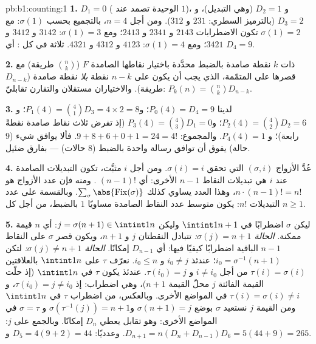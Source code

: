 \begin{solution}{pb:b1:counting:1}
\textbf{1.} $D_1 = 0$ ( الوحيدة تصمد عند $1$)، و $D_2 = 1$
(وهي التبديل)، و $D_3 = 2$ (بالترميز السطري: $231$ و $312$). ومن أجل
$n = 4$، بالتجميع بحسب $\sigma(1)$: مع $\sigma(1) = 2$ تكون الاضطرابات
$2143$ و $2341$ و $2413$؛ ومع $\sigma(1) = 3$: $3142$ و $3412$
و $3421$؛ ومع $\sigma(1) = 4$: $4123$ و $4312$ و $4321$. ثلاثة في كل
: أي $D_4 = 9$.

\textbf{2.}  ذات $k$ نقطة صامدة بالضبط محدَّدة
باختيار  نقاطها الصامدة $F$ ($\binom nk$ طريقة) مع
قصرها على المتمّمة، الذي يجب أن يكون  على $n - k$ نقطة
\emph{بلا} نقطة صامدة ($D_{n-k}$ طريقة). والاختياران مستقلان
والتقارن تقابليّ: $P_k(n) = \binom nk D_{n-k}$.

\textbf{3.} لدينا $P_0(4) = D_4 = 9$؛ و$P_1(4) = \binom41 D_3 = 4 \times 2
= 8$؛ و$P_2(4) = \binom42 D_2 = 6$؛ و$P_3(4) = \binom43 D_1 = 0$
(إذ تفرض ثلاث نقاط صامدة نقطةً رابعة)؛ و $P_4(4) = 1$. والمجموع: $9 + 8 + 6
+ 0 + 1 = 24 = 4!$. فألا يوافق شيء ($9$ حالة) يفوق أن توافق رسالة واحدة بالضبط
($8$ حالات) --- بفارق ضئيل.

\textbf{4.} عُدَّ الأزواج $(\sigma, i)$ التي تحقق $\sigma(i) = i$. ومن أجل
$i$ مثبَّت، تكون التبديلات الصامدة عند $i$ هي تبديلات النقاط
$n - 1$ الأخرى: أي $(n-1)!$ . ومنه فإن عدد الأزواج
هو $n \cdot (n-1)! = n!$، وهذا العدد يساوي كذلك
$\sum_\sigma \abs{\mathrm{Fix}(\sigma)}$. وبالقسمة على عدد
التبديلات $n!$: يكون متوسط عدد النقاط الصامدة مساويًا
$1$ بالضبط، من أجل كل $n \geq 1$.

\textbf{5.} ليكن $\sigma$ اضطرابًا في $\intint1{n+1}$ وليكن
$j = \sigma(n+1) \in \intint1n$: أي $n$ قيمة ممكنة. \emph{الحالة
$\sigma(j) = n+1$:} تتبادل النقطتان $j$ و $n+1$، ويكون قصر $\sigma$
على النقاط $n - 1$ الباقية اضطرابًا كيفيًا فيها:
أي $D_{n-1}$ إمكانًا. \emph{الحالة $\sigma(j)
\neq n+1$:} لتكن $i_0 = \sigma^{-1}(n+1)$؛ عندئذ $i_0 \neq j$ و
$i_0 \leq n$. نعرّف $\tau$ على $\intint1n$ بالعلاقتين $\tau(i) = \sigma(i)$
من أجل $i \neq i_0$ و $\tau(i_0) = j$. عندئذ يكون $\tau$ 
في $\intint1n$ (إذ حلّت القيمة الفائتة $j$ محلّ القيمة $n+1$)،
وهي اضطراب: إذ $\tau(i_0) = j \neq i_0$، و
$\tau(i) = \sigma(i) \neq i$ في المواضع الأخرى. وبالعكس، من
اضطراب $\tau$ في $\intint1n$ ومن القيمة $j$ نستعيد
$\sigma$ بوضع $\sigma(n+1) = j$ و$\sigma(\tau^{-1}(j)) = n+1$
و $\sigma = \tau$ في المواضع الأخرى: وهو تقابل يعطي $D_n$
إمكانًا. وبالجمع على $j$: $D_{n+1} = n(D_n + D_{n-1})$.
وعدديًا: $D_5 = 4(9 + 2) = 44$ و$D_6 = 5(44 + 9) = 265$.


\end{solution}
